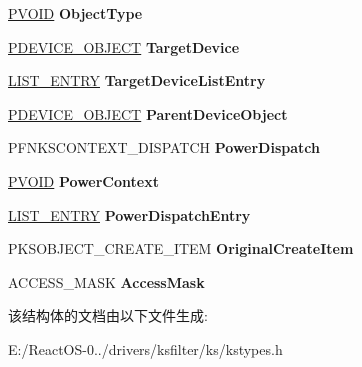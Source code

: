 \begin{DoxyCompactItemize}
\hyperlink{interfacevoid}{P\+V\+O\+ID} {\bfseries Object\+Type}
\item 
\mbox{\label{struct_k_s_i_o_b_j_e_c_t___h_e_a_d_e_r_a5d8470c2a708fb7d51f1a6f587ea9da8}} 
\hyperlink{struct___d_e_v_i_c_e___o_b_j_e_c_t}{P\+D\+E\+V\+I\+C\+E\+\_\+\+O\+B\+J\+E\+CT} {\bfseries Target\+Device}
\item 
\mbox{\label{struct_k_s_i_o_b_j_e_c_t___h_e_a_d_e_r_a07617162a9c75f4376bbfd0b0470371e}} 
\hyperlink{struct___l_i_s_t___e_n_t_r_y}{L\+I\+S\+T\+\_\+\+E\+N\+T\+RY} {\bfseries Target\+Device\+List\+Entry}
\item 
\mbox{\label{struct_k_s_i_o_b_j_e_c_t___h_e_a_d_e_r_afa012000679f208bec7057cde4d0479a}} 
\hyperlink{struct___d_e_v_i_c_e___o_b_j_e_c_t}{P\+D\+E\+V\+I\+C\+E\+\_\+\+O\+B\+J\+E\+CT} {\bfseries Parent\+Device\+Object}
\item 
\mbox{\label{struct_k_s_i_o_b_j_e_c_t___h_e_a_d_e_r_aba1ebe7860191451066adb3c27bea1df}} 
P\+F\+N\+K\+S\+C\+O\+N\+T\+E\+X\+T\+\_\+\+D\+I\+S\+P\+A\+T\+CH {\bfseries Power\+Dispatch}
\item 
\mbox{\label{struct_k_s_i_o_b_j_e_c_t___h_e_a_d_e_r_a9d51e083e7fd7affb689da45b499fbfe}} 
\hyperlink{interfacevoid}{P\+V\+O\+ID} {\bfseries Power\+Context}
\item 
\mbox{\label{struct_k_s_i_o_b_j_e_c_t___h_e_a_d_e_r_ab9717e4c00ef3e93fd52292e1e18e0c2}} 
\hyperlink{struct___l_i_s_t___e_n_t_r_y}{L\+I\+S\+T\+\_\+\+E\+N\+T\+RY} {\bfseries Power\+Dispatch\+Entry}
\item 
\mbox{\label{struct_k_s_i_o_b_j_e_c_t___h_e_a_d_e_r_a294d88fb1af3cda875a902655ab915ee}} 
P\+K\+S\+O\+B\+J\+E\+C\+T\+\_\+\+C\+R\+E\+A\+T\+E\+\_\+\+I\+T\+EM {\bfseries Original\+Create\+Item}
\item 
\mbox{\label{struct_k_s_i_o_b_j_e_c_t___h_e_a_d_e_r_ad4a7223840fb39d14674309ab454495a}} 
A\+C\+C\+E\+S\+S\+\_\+\+M\+A\+SK {\bfseries Access\+Mask}
\end{DoxyCompactItemize}


该结构体的文档由以下文件生成\+:\begin{DoxyCompactItemize}
\item 
E\+:/\+React\+O\+S-\/0../drivers/ksfilter/ks/kstypes.\+h\end{DoxyCompactItemize}

